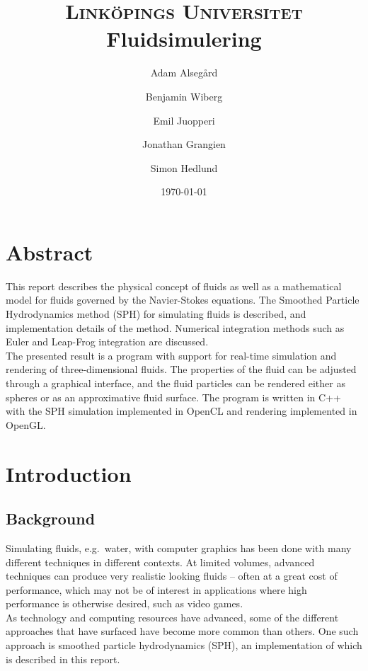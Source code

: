 \documentclass[paper=a4, fontsize=11pt]{report}
\title{
\normalfont \normalsize 
\textsc{Linköpings Universitet} \\ [25pt] %
\huge Fluidsimulering  \\ %
}
\author{Adam Alsegård \and Benjamin Wiberg \and Emil Juopperi \and Jonathan Grangien \and Simon Hedlund}
\date{\normalsize\today} %
\numberwithin{equation}{section} %
\numberwithin{figure}{section} %
\numberwithin{table}{section} %
\begin{document}
\maketitle %

\chapter*{Abstract}
This report describes the physical concept of fluids as well as a mathematical model for fluids governed by the Navier-Stokes equations. The Smoothed Particle Hydrodynamics method (SPH) for simulating fluids is described, and implementation details of the method. Numerical integration methods such as Euler and Leap-Frog integration are discussed. \\
The presented result is a program with support for real-time simulation and rendering of three-dimensional fluids. The properties of the fluid can be adjusted through a graphical interface, and the fluid particles can be rendered either as spheres or as an approximative fluid surface. The program is written in C++ with the SPH simulation implemented in OpenCL and rendering implemented in OpenGL.

\tableofcontents

\chapter{Introduction}
\section{Background}
Simulating fluids, e.g.\ water, with computer graphics has been done with many different techniques in different contexts. At limited volumes, advanced techniques can produce very realistic looking fluids -- often at a great cost of performance, which may not be of interest in applications where high performance is otherwise desired, such as video games. \\
As technology and computing resources have advanced, some of the different approaches that have surfaced have become more common than others. One such approach is smoothed particle hydrodynamics (SPH), an implementation of which is described in this report.

\end{document}
